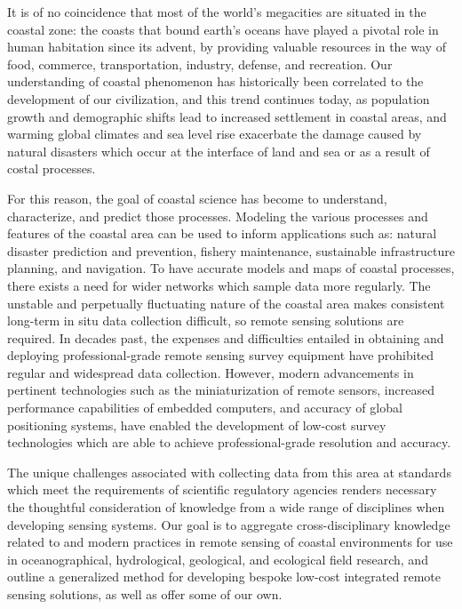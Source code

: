 \documentclass{article}
\begin{document}
\par{It is of no coincidence that most of the world’s megacities are situated in the coastal zone: the coasts that bound earth’s oceans have played a pivotal role in human habitation since its advent, by providing valuable resources in the way of food, commerce, transportation, industry, defense, and recreation. Our understanding of coastal phenomenon has historically been correlated to the development of our civilization, and this trend continues today, as population growth and demographic shifts lead to increased settlement in coastal areas, and warming global climates and sea level rise exacerbate the damage caused by natural disasters which occur at the interface of land and sea or as a result of costal processes.}

\par{For this reason, the goal of coastal science has become to understand, characterize, and predict those processes. Modeling the various processes and features of the coastal area can be used to inform applications such as: natural disaster prediction and prevention, fishery maintenance, sustainable infrastructure planning, and navigation. To have accurate models and maps of coastal processes, there exists a need for wider networks which sample data more regularly. The unstable and perpetually fluctuating nature of the coastal area makes consistent long-term in situ data collection difficult, so remote sensing solutions are required. In decades past, the expenses and difficulties entailed in obtaining and deploying professional-grade remote sensing survey equipment have prohibited regular and widespread data collection. However, modern advancements in pertinent technologies such as the miniaturization of remote sensors, increased performance capabilities of embedded computers, and accuracy of global positioning systems, have enabled the development of low-cost survey technologies which are able to achieve professional-grade resolution and accuracy.}

{The unique challenges associated with collecting data from this area at standards which meet the requirements of scientific regulatory agencies renders necessary the thoughtful consideration of knowledge from a wide range of disciplines when developing sensing systems. Our goal is to aggregate cross-disciplinary knowledge related to and modern practices in remote sensing of coastal environments for use in oceanographical, hydrological, geological, and ecological field research, and outline a generalized method for developing bespoke low-cost integrated remote sensing solutions, as well as offer some of our own. \par} 
\end{document}
